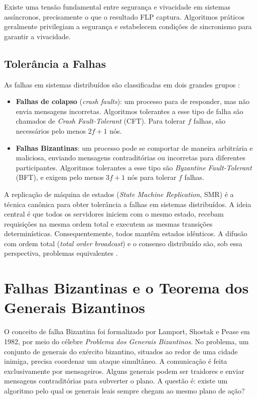 \documentclass[12pt,a4paper]{report}
\begin{document}
Existe uma tensão fundamental entre segurança e vivacidade em sistemas assíncronos, precisamente o que o resultado FLP captura. Algoritmos práticos geralmente privilegiam a segurança e estabelecem condições de sincronismo para garantir a vivacidade.

\subsection{Tolerância a Falhas}

As falhas em sistemas distribuídos são classificadas em dois grandes grupos \cite{Bashir2023}:

\begin{itemize}
    \item \textbf{Falhas de colapso} (\textit{crash faults}): um processo para de responder, mas não envia mensagens incorretas. Algoritmos tolerantes a esse tipo de falha são chamados de \textit{Crash Fault-Tolerant} (CFT). Para tolerar $f$ falhas, são necessários pelo menos $2f + 1$ nós.
    \item \textbf{Falhas Bizantinas}: um processo pode se comportar de maneira arbitrária e maliciosa, enviando mensagens contraditórias ou incorretas para diferentes participantes. Algoritmos tolerantes a esse tipo são \textit{Byzantine Fault-Tolerant} (BFT), e exigem pelo menos $3f + 1$ nós para tolerar $f$ falhas.
\end{itemize}

A replicação de máquina de estados (\textit{State Machine Replication}, SMR) é a técnica canônica para obter tolerância a falhas em sistemas distribuídos. A ideia central é que todos os servidores iniciem com o mesmo estado, recebam requisições na mesma ordem total e executem as mesmas transições determinísticas. Consequentemente, todos mantêm estados idênticos. A difusão com ordem total (\textit{total order broadcast}) e o consenso distribuído são, sob essa perspectiva, problemas equivalentes \cite{Bashir2023}.

\section[Falhas Bizantinas]{Falhas Bizantinas e o Teorema dos Generais Bizantinos}

O conceito de falha Bizantina foi formalizado por Lamport, Shostak e Pease em 1982, por meio do célebre \textit{Problema dos Generais Bizantinos}. No problema, um conjunto de generais do exército bizantino, situados ao redor de uma cidade inimiga, precisa coordenar um ataque simultâneo. A comunicação é feita exclusivamente por mensageiros. Alguns generais podem ser traidores e enviar mensagens contraditórias para subverter o plano. A questão é: existe um algoritmo pelo qual os generais leais sempre chegam ao mesmo plano de ação?
\end{document}
